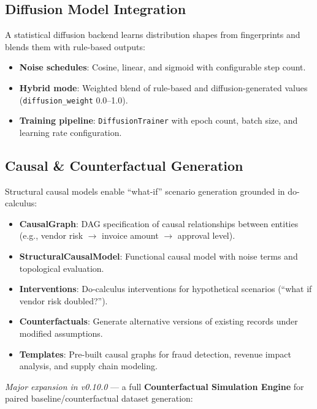 \documentclass[11pt,a4paper]{article}
\begin{document}
\subsection{Diffusion Model Integration}

A statistical diffusion backend learns distribution shapes from fingerprints
and blends them with rule-based outputs:

\begin{itemize}[leftmargin=1.4em, itemsep=2pt]
  \item \textbf{Noise schedules}: Cosine, linear, and sigmoid with configurable
        step count.
  \item \textbf{Hybrid mode}: Weighted blend of rule-based and diffusion-generated
        values (\texttt{diffusion\_weight} 0.0--1.0).
  \item \textbf{Training pipeline}: \texttt{DiffusionTrainer} with epoch count,
        batch size, and learning rate configuration.
\end{itemize}

\subsection{Causal \& Counterfactual Generation}

Structural causal models enable ``what-if'' scenario generation grounded in
do-calculus:

\begin{itemize}[leftmargin=1.4em, itemsep=2pt]
  \item \textbf{CausalGraph}: DAG specification of causal relationships between
        entities (e.g., vendor risk $\to$ invoice amount $\to$ approval level).
  \item \textbf{StructuralCausalModel}: Functional causal model with noise terms
        and topological evaluation.
  \item \textbf{Interventions}: Do-calculus interventions for hypothetical scenarios
        (``what if vendor risk doubled?'').
  \item \textbf{Counterfactuals}: Generate alternative versions of existing records
        under modified assumptions.
  \item \textbf{Templates}: Pre-built causal graphs for fraud detection, revenue
        impact analysis, and supply chain modeling.
\end{itemize}

\noindent
\textit{Major expansion in v0.10.0} --- a full \textbf{Counterfactual Simulation Engine}
for paired baseline/counterfactual dataset generation:
\end{document}
